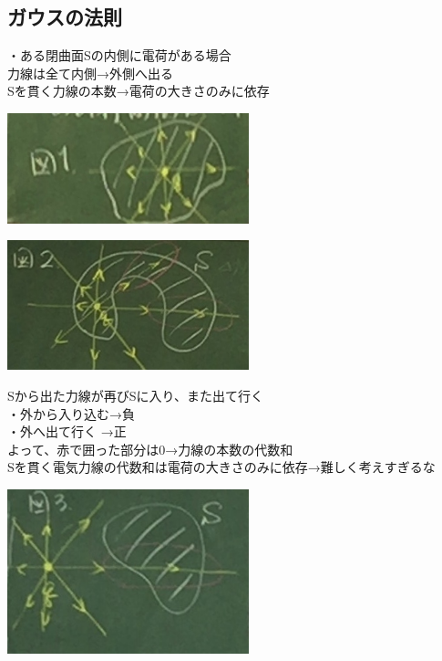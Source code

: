 \documentclass{jsarticle}
\begin{document}
	\subsection{ガウスの法則}
		{\Large・ある閉曲面Sの内側に電荷がある場合}\\
		力線は全て内側→外側へ出る\\
		Sを貫く力線の本数→電荷の大きさのみに依存\\
		\begin{minipage}{0.5\hsize}	
		\begin{center}
			\includegraphics[width=7cm]{5_10_7.JPG}
		\end{center}
		\end{minipage}
		\begin{minipage}{0.5\hsize}	
		\begin{center}
			\includegraphics[width=7cm]{5_10_8.JPG}
		\end{center}
		\end{minipage}
		Sから出た力線が再びSに入り、また出て行く\\
		・外から入り込む→負\\
		・外へ出て行く  →正\\
		よって、赤で囲った部分は0→力線の本数の代数和\\
		Sを貫く電気力線の代数和は電荷の大きさのみに依存→難しく考えすぎるな\\
		\begin{center}
			\includegraphics[width=7cm]{5_10_9.JPG}
		\end{center}
\end{document}
